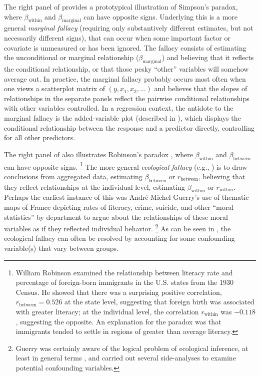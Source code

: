 The right panel of  provides a prototypical illustration of Simpson's paradox,
where $\beta_{\textrm{within}}$ and $\beta_{\textrm{marginal}}$ can have opposite signs. Underlying this is a
more general \emph{marginal fallacy} (requiring only substantively different estimates, but not necessarily
different signs),
that can occur when some important factor or covariate is unmeasured
or has been ignored. The fallacy consists of estimating the unconditional or marginal
relationship ($\beta_{\textrm{marginal}}$) and believing that it reflects the conditional relationship, or that
those pesky ``other'' variables will somehow average out. In practice, the marginal fallacy probably occurs most
often when one views a scatterplot matrix of $(y, x_1, x_2, \dots)$ and believes that the slopes of
relationships in the separate panels reflect the pairwise conditional relationships with other variables
controlled. In a regression context, the antidote to the marginal fallacy is the added-variable
plot (described in ),
which displays the conditional relationship between the response and a predictor directly, controlling for all other predictors.

The right panel of  also illustrates Robinson's paradox \citep{Robinson:1950},
where $\beta_{\textrm{within}}$ and $\beta_{\textrm{between}}$ can have opposite signs.%
\footnote{
William Robinson \citeyearpar{Robinson:1950} examined the relationship between literacy rate and percentage
of foreign-born immigrants in the U.S. states from the 1930 Census.
He showed that there was a surprising
positive correlation, $r_{\textrm{between}}= 0.526$ at the state level,
suggesting that foreign birth was associated with greater literacy;
at the individual level, the correlation $r_{\textrm{within}}$ was $-0.118$, suggesting the opposite.
An explanation for the paradox was that immigrants tended to settle in regions of greater than
average literacy.
}
The more general \emph{ecological fallacy} (e.g., \citealp{Lichtman:1974,Kramer:1983})
is to draw conclusions from aggregated data, estimating
$\beta_{\textrm{between}}$ or $r_{\textrm{between}}$, believing that they reflect relationships
at the individual level, estimating $\beta_{\textrm{within}}$ or $r_{\textrm{within}}$.
Perhaps the earliest instance of this was Andr\'e-Michel Guerry's \citeyearpar{Guerry:1833} use of thematic maps of
France depicting rates of literacy, crime, suicide, and other ``moral statistics'' by department to argue
about the relationships of these moral variables as if they reflected individual behavior.%
\footnote{
Guerry was certainly aware of the logical problem of ecological inference, at least in general terms
\citep{Friendly:07:guerry}, and carried out several side-analyses to examine potential confounding
variables.
}
As can be seen in , the ecological fallacy can often be resolved
by accounting for some confounding variable(s) that vary between groups.

